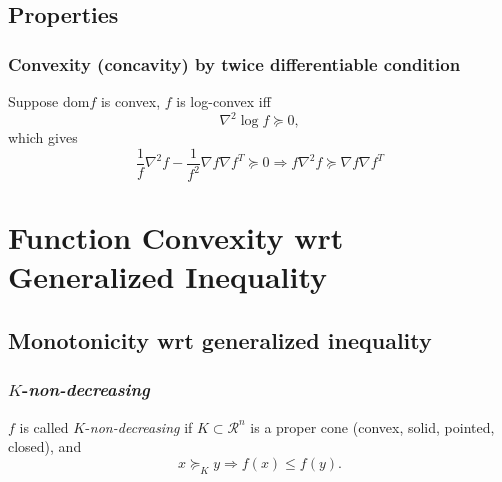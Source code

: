 \subsection{Properties}
\subsubsection{Convexity (concavity) by twice differentiable condition}
Suppose dom$f$ is convex, $f$ is log-convex iff 
\begin{equation}
   \nabla^2 \log f \succeq 0,
\end{equation}
which gives
\begin{equation}
   \frac{1}{f}\nabla^2 f- \frac{1}{f^2}\nabla f \nabla f^T \succeq 0 \Rightarrow f\nabla^2 f \succeq \nabla f \nabla f^T
\end{equation}

\section{Function Convexity wrt Generalized Inequality}
\subsection{Monotonicity wrt generalized inequality}
\subsubsection{$K$-\emph{non-decreasing}}
$f$ is called $K$-\emph{non-decreasing} if $K \subset \mathcal{R}^n$ is a proper cone (convex, solid, pointed, closed), and
\begin{equation}
   x \succeq_K y \Rightarrow f(x) \le f(y).
\end{equation}





%


